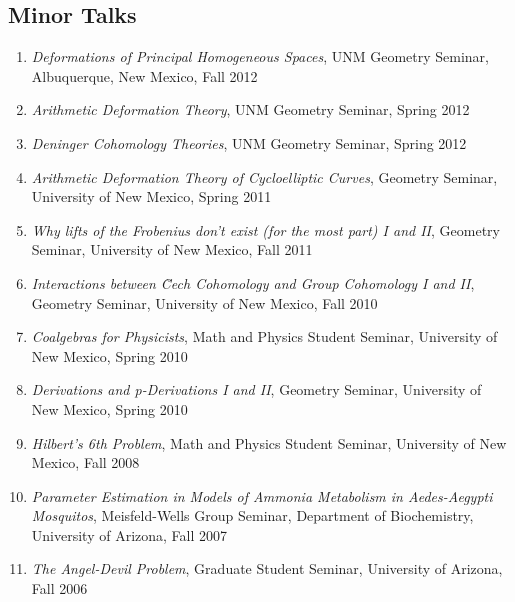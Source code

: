 \documentclass[a4paper,10pt]{article}
\begin{document}
\subsection*{Minor Talks}
\begin{enumerate}

 \item \emph{Deformations of Principal Homogeneous Spaces}, UNM Geometry Seminar, Albuquerque, New Mexico, Fall 2012
 \item \emph{ Arithmetic Deformation Theory}, UNM Geometry Seminar, Spring 2012
 \item \emph{ Deninger Cohomology Theories}, UNM Geometry Seminar, Spring 2012
 \item  \emph{Arithmetic Deformation Theory of Cycloelliptic Curves}, Geometry Seminar, University of New Mexico, Spring 2011
\item \emph{Why lifts of the Frobenius don't exist (for the most part) I and II}, Geometry Seminar, University of New Mexico, Fall 2011
 \item  \emph{Interactions between \u{C}ech Cohomology and Group Cohomology I and II}, Geometry Seminar, University of New Mexico, Fall 2010
 \item \emph{Coalgebras for Physicists}, Math and Physics Student Seminar, University of New Mexico, Spring 2010
 \item \emph{Derivations and p-Derivations I and II}, Geometry Seminar, University of New Mexico, Spring 2010
 \item \emph{Hilbert's 6th Problem}, Math and Physics Student Seminar, University of New Mexico, Fall 2008
 \item \emph{Parameter Estimation in Models of Ammonia Metabolism in Aedes-Aegypti Mosquitos}, Meisfeld-Wells Group Seminar, Department of Biochemistry, University of Arizona, Fall 2007
 \item  \emph{The Angel-Devil Problem}, Graduate Student Seminar, University of Arizona, Fall 2006
\end{enumerate}
\fi

\iffalse
\end{document}

